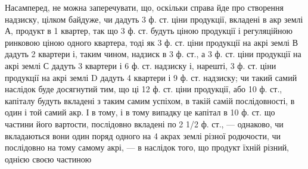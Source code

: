 Насамперед, не можна заперечувати, що, оскільки справа йде про створення
надзиску, цілком байдуже, чи дадуть 3 ф. ст. ціни продукції, вкладені в акр
землі А, продукт в 1 квартер, так що 3 ф. ст. будуть ціною продукції і регуляційною
ринковою ціною одного квартера, тоді як 3 ф. ст. ціни продукції на акрі землі
В дадуть 2 квартери і, таким чином, надзиск в 3 ф. ст., а 3 ф. ст. ціни продукції
на акрі землі С дадуть 3 квартери і 6 ф. ст. надзиску і, нарешті, 3 ф. ст. ціни
продукції на акрі землі D дадуть 4 квартери і 9 ф. ст. надзиску; чи такий самий
наслідок буде досягнутий тим, що ці 12 ф. ст. ціни продукції, або 10 ф. ст.,
капіталу будуть вкладені з таким самим успіхом, в такій самій послідовності,
в один і той самий акр. І в тому, і в тому випадку це капітал в 10 ф. ст.
що частини його вартости, послідовно вкладені по 2 1/2 ф. ст., — однаково, чи вкладаються
вони один поряд одного на 4 акрах землі різної родючости, чи послідовно на
тому самому акрі, — в наслідок того, що продукт їхній різний, однією своєю частиною
